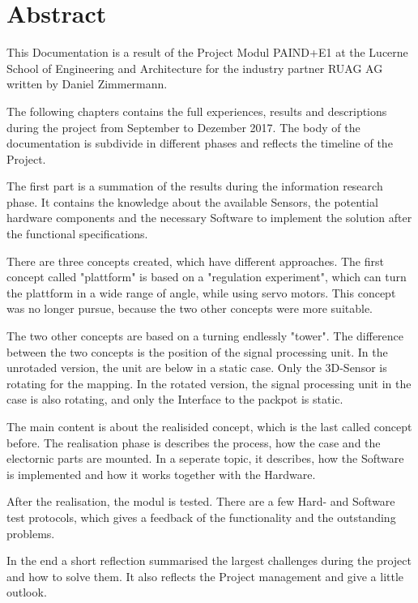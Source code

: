 \chapter*{Abstract}
\label{chap:Abstract}
This Documentation is a result of the Project Modul PAIND+E1 at the Lucerne School of Engineering and Architecture for the industry partner RUAG AG written by Daniel Zimmermann. 

The following chapters contains the full experiences, results and descriptions during the project from September to Dezember 2017. The body of the documentation is subdivide in different phases and reflects the timeline of the Project. 

The first part is a summation of the results during the information research phase. It contains the knowledge about the available Sensors, the potential hardware components and the necessary Software to implement the solution after the functional specifications.  

There are three concepts created, which have different approaches. The first concept called "plattform" is based on a "regulation experiment", which can turn the plattform in a wide range of angle, while using servo motors.  This concept was no longer pursue, because the two other concepts were more suitable.

The two other concepts are based on a turning endlessly "tower". The difference between the two concepts is the position of the signal processing unit. In the unrotaded version, the unit are below in a static case. Only the 3D-Sensor is rotating for the mapping. In the rotated version, the signal processing unit in the case is also rotating, and only the Interface to the packpot is static. 

The main content is about the realisided concept, which is the last called concept before. The realisation phase is describes the process, how the case and the electornic parts are mounted. In a seperate topic, it describes, how the Software is implemented and how it works together with the Hardware. 

After the realisation, the modul is tested. There are a few Hard- and Software test protocols, which gives a feedback of the functionality and the outstanding problems.

In the end a short reflection summarised the largest challenges during the project and how to solve them. It also reflects the Project management and give a little outlook.



